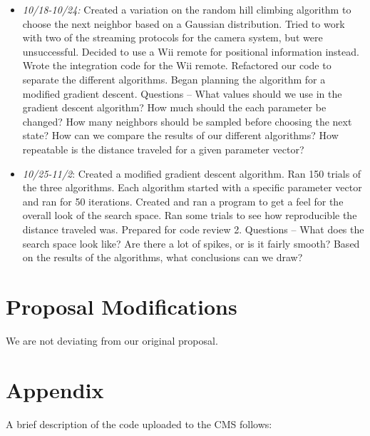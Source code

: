 \begin{itemize}
\item \emph{10/18-10/24:} Created a variation on the random hill climbing algorithm to choose the next neighbor based on a Gaussian distribution. Tried to work with two of the streaming protocols for the camera system, but were unsuccessful. Decided to use a Wii remote for positional information instead. Wrote the integration code for the Wii remote. Refactored our code to separate the different algorithms. Began planning the algorithm for a modified gradient descent.
Questions -- What values should we use in the gradient descent algorithm? How much should the each parameter be changed? How many neighbors should be sampled before choosing the next state? How can we compare the results of our different algorithms? How repeatable is the distance traveled for a given parameter vector?
\item \emph{10/25-11/2}: Created a modified gradient descent algorithm. Ran 150 trials of the three algorithms. Each algorithm started with a specific parameter vector and ran for 50 iterations. Created and ran a program to get a feel for the overall look of the search space. Ran some trials to see how reproducible the distance traveled was. Prepared for code review 2. Questions -- What does the search space look like? Are there a lot of spikes, or is it fairly smooth? Based on the results of the algorithms, what conclusions can we draw?
\end{itemize}



\section{Proposal Modifications}

We are not deviating from our original proposal.



\section{Appendix}

A brief description of the code uploaded to the CMS follows:

